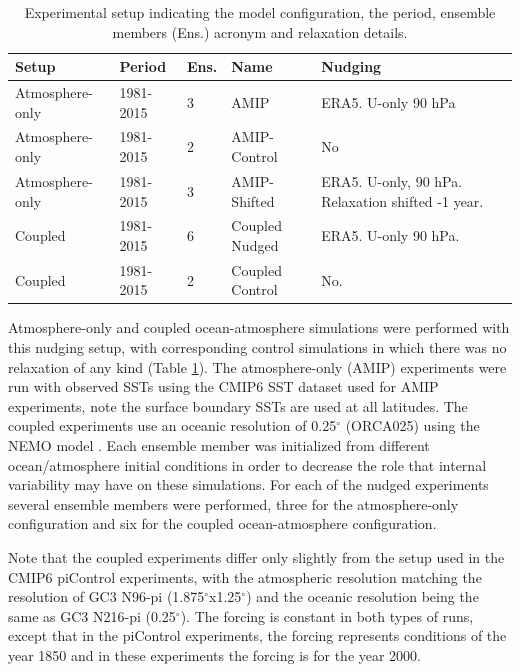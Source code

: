 \begin{table}[t!]
\caption{Experimental setup indicating the model configuration, the period, ensemble members (Ens.) acronym and relaxation details.}
\begin{tabular}{p{3.2cm}|p{}|p{1.35cm}|p{3cm}|p{4.85cm}} \label{tab:nudg_exps}
Setup           & Period    & Ens.& Name            & Nudging                                          \\ \hline \hline
Atmosphere-only & 1981-2015 & 3                & AMIP            & ERA5. U-only 90 hPa                              \\
Atmosphere-only & 1981-2015 & 2                & AMIP-Control    & No                                               \\
Atmosphere-only & 1981-2015 & 3                & AMIP-Shifted    & ERA5. U-only, 90 hPa. Relaxation shifted -1 year. \\
Coupled         & 1981-2015 & 6                & Coupled Nudged     & ERA5. U-only 90 hPa.                             \\
Coupled         & 1981-2015 & 2                & Coupled Control & No.                                             
\end{tabular}
\end{table}

Atmosphere-only and coupled ocean-atmosphere simulations were performed with this nudging setup, with corresponding control simulations in which there was no relaxation of any kind (Table \ref{tab:nudg_exps}). The atmosphere-only (AMIP) experiments were run with observed SSTs using the CMIP6 SST dataset used for AMIP experiments, note the surface boundary SSTs are used at all latitudes. The coupled experiments use an oceanic resolution of 0.25$^\circ$ (ORCA025) using the NEMO model \citep{storkey2018}. Each ensemble member was initialized from different ocean/atmosphere initial conditions in order to decrease the role that internal variability may have on these simulations. 
For each of the nudged experiments several ensemble members were performed, three for the atmosphere-only configuration and six for the coupled ocean-atmosphere configuration. 


Note that the coupled experiments differ only slightly from the setup used in the CMIP6 piControl experiments, with the atmospheric resolution matching the resolution of GC3 N96-pi (1.875$^\circ$x1.25$^\circ$) and the oceanic resolution being the same as GC3 N216-pi (0.25$^\circ$). The forcing is constant in both types of runs, except that in the piControl experiments, the forcing represents conditions of the year 1850 and in these experiments the forcing is for the year 2000. 



